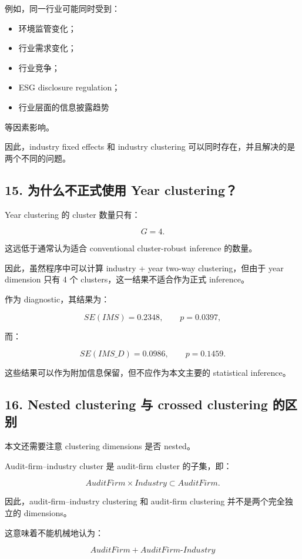 \documentclass[11pt]{article}
\begin{document}
例如，同一行业可能同时受到：

\begin{itemize}
    \item 环境监管变化；
    \item 行业需求变化；
    \item 行业竞争；
    \item ESG disclosure regulation；
    \item 行业层面的信息披露趋势
\end{itemize}

等因素影响。

因此，industry fixed effects 和 industry clustering 可以同时存在，并且解决的是两个不同的问题。

\subsection{15. 为什么不正式使用 Year clustering？}

Year clustering 的 cluster 数量只有：

\[
G=4.
\]

这远低于通常认为适合 conventional cluster-robust inference 的数量。

因此，虽然程序中可以计算 industry + year two-way clustering，但由于 year dimension 只有 4 个 clusters，这一结果不适合作为正式 inference。

作为 diagnostic，其结果为：

\[
SE(IMS)=0.2348,\qquad p=0.0397,
\]

而：

\[
SE(IMS\_D)=0.0986,\qquad p=0.1459.
\]

这些结果可以作为附加信息保留，但不应作为本文主要的 statistical inference。

\subsection{16. Nested clustering 与 crossed clustering 的区别}

本文还需要注意 clustering dimensions 是否 nested。

Audit-firm--industry cluster 是 audit-firm cluster 的子集，即：

\[
AuditFirm \times Industry \subset AuditFirm.
\]

因此，audit-firm--industry clustering 和 audit-firm clustering 并不是两个完全独立的 dimensions。

这意味着不能机械地认为：

\[
AuditFirm + AuditFirm\text{-}Industry
\]
\end{document}
